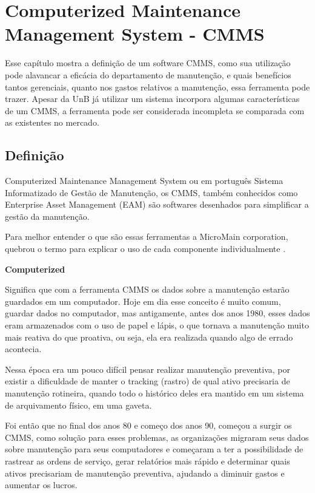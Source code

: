 \chapter{Computerized Maintenance Management System - CMMS}
\label{cmms}

Esse capítulo mostra a definição de um software CMMS, como sua utilização pode alavancar a eficácia do departamento de manutenção, e quais benefícios tantos gerenciais, quanto nos gastos relativos a manutenção, essa ferramenta pode trazer. Apesar da UnB já utilizar um sistema incorpora algumas características de um CMMS, a ferramenta pode ser considerada incompleta se comparada com as existentes no mercado.



\section{Definição}

Computerized Maintenance Management System ou em português Sistema Informatizado de Gestão de Manutenção, os CMMS, também conhecidos como Enterprise Asset Management (EAM) são softwares desenhados para simplificar a gestão da manutenção.

Para melhor entender o que são essas ferramentas a MicroMain corporation, quebrou o termo para explicar o uso de cada componente individualmente \cite{micromain}.

\textbf{Computerized}

Significa que com a ferramenta CMMS os dados sobre a manutenção estarão guardados em um computador. Hoje em dia esse conceito é muito comum, guardar dados no computador, mas antigamente, antes dos anos 1980, esses dados eram armazenados com o uso de papel e lápis, o que tornava a manutenção muito mais reativa do que proativa, ou seja, ela era realizada quando algo de errado acontecia. 

Nessa época era um pouco difícil pensar realizar manutenção preventiva, por existir a dificuldade de manter o tracking (rastro) de qual ativo precisaria de manutenção rotineira, quando todo o histórico deles era mantido em um sistema de arquivamento físico, em uma gaveta. 

Foi então que no final dos anos 80 e começo dos anos 90, começou a surgir os CMMS, como solução para esses problemas, as organizações migraram seus dados sobre manutenção para seus computadores e começaram a ter a possibilidade de rastrear as ordens de serviço, gerar relatórios mais rápido e determinar quais ativos precisariam de manutenção preventiva, ajudando a diminuir gastos e aumentar os lucros. 

